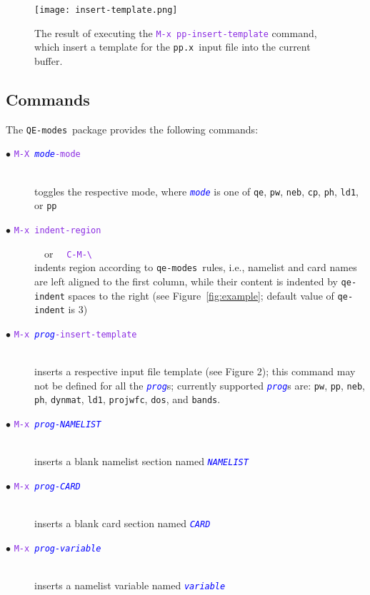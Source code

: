 \documentclass[12pt,a4paper]{article}
\def\ppx{\texttt{pp.x}}
\def\QEmodes{\texttt{QE-modes}}
\def\qemodes{\texttt{qe-modes}}
\def\efn#1{\textcolor{BlueViolet}{\texttt{#1}}}
\def\var#1{\textcolor{Blue}{\texttt{\textit{#1}}}}
\begin{document}
\begin{figure}[htb]
  \centering
  \texttt{[image: insert-template.png]}
  \caption{The result of executing the \efn{M-x pp-insert-template}
    command, which insert a template for the \ppx\ input file into the
    current buffer.}
  \label{fig:insert-template}
\end{figure}
\subsection{Commands}

The \QEmodes\ package provides the following commands:
\begin{description}
\item[$\bullet$ \efn{M-X \var{mode}-mode}]\hfill\\ toggles
  the respective mode, where \var{mode} is one of \texttt{qe},
  \texttt{pw}, \texttt{neb}, \texttt{cp}, \texttt{ph}, \texttt{ld1}, or \texttt{pp}

\item[$\bullet$ \efn{M-x indent-region}] ~~{\rm or}~~ \efn{C-M-\textbackslash}\hfill\\
  indents region according to \qemodes\ rules, i.e., namelist and card
  names are left aligned to the first column, while their content is
  indented by \texttt{qe-indent} spaces to the right (see
  Figure~\ref{fig:example}; default value of \texttt{qe-indent} is 3)

\item[$\bullet$ \efn{M-x \var{prog}-insert-template}]\hfill\\
  inserts a respective input file template (see Figure 2); this
  command may not be defined for all the \var{prog}s; currently
  supported \var{prog}s are: \texttt{pw}, \texttt{pp}, \texttt{neb},
  \texttt{ph}, \texttt{dynmat}, \texttt{ld1}, \texttt{projwfc},
  \texttt{dos}, and \texttt{bands}.

\item[$\bullet$ \efn{M-x \var{prog-NAMELIST}}]\hfill\\ 
  inserts a blank namelist section named \var{NAMELIST}

\item[$\bullet$ \efn{M-x \var{prog-CARD}}]\hfill\\
  inserts a blank card section named \var{CARD}

\item[$\bullet$ \efn{M-x \var{prog-variable}}]\hfill\\
  inserts a namelist variable named \var{variable}

\end{description}
\end{document}
